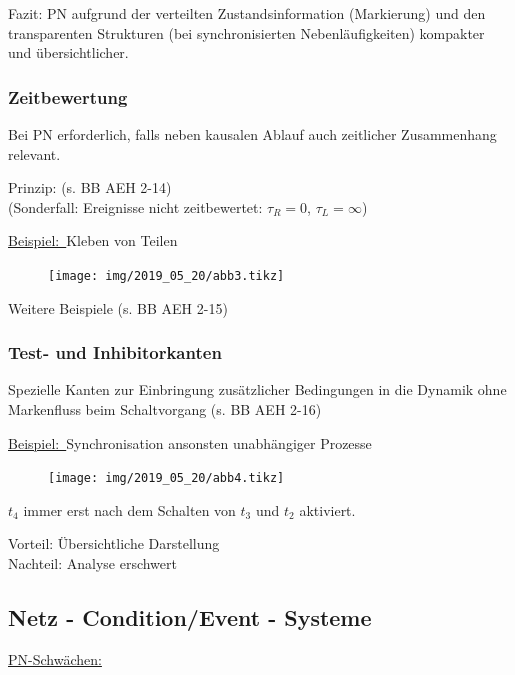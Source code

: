 \documentclass[12pt,a4paper]{scrartcl}
\numberwithin{equation}{section}
\newcommand{\beispiel}{\underline{Beispiel:~}}
\begin{document}
Fazit: PN aufgrund der verteilten Zustandsinformation (Markierung) und den transparenten Strukturen (bei synchronisierten Nebenläufigkeiten) kompakter und übersichtlicher.

\subsubsection{Zeitbewertung}
Bei PN erforderlich, falls neben kausalen Ablauf auch zeitlicher Zusammenhang relevant. 

Prinzip: (s. BB AEH 2-14)\\
(Sonderfall: Ereignisse nicht zeitbewertet: $\tau_R=0$, $\tau_L=\infty$)

\beispiel Kleben von Teilen

\begin{figure}[H]
	\centering
	\texttt{[image: img/2019\_05\_20/abb3.tikz]}
\end{figure}

Weitere Beispiele (s. BB AEH 2-15)

\subsubsection{Test- und Inhibitorkanten}
Spezielle Kanten zur Einbringung zusätzlicher Bedingungen in die Dynamik ohne Markenfluss beim Schaltvorgang (s. BB AEH 2-16)

\beispiel Synchronisation ansonsten unabhängiger Prozesse
\begin{figure}[H]
	\centering
	\texttt{[image: img/2019\_05\_20/abb4.tikz]}
\end{figure}

$t_4$ immer erst nach dem Schalten von $t_3$ und $t_2$ aktiviert.

Vorteil: Übersichtliche Darstellung\\
Nachteil: Analyse erschwert

\subsection{Netz - Condition/Event - Systeme}
\underline{PN-Schwächen:}
\end{document}

